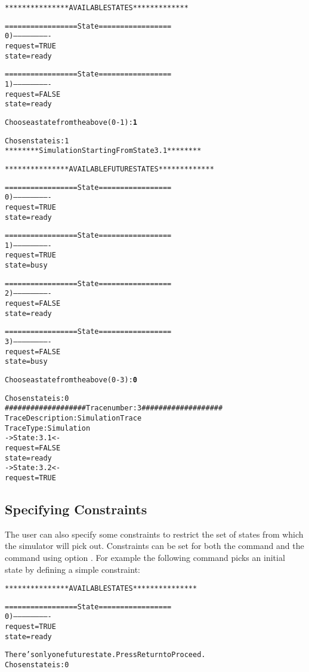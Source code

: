 \begin{alltt}
\nusmvprompt {}

***************  AVAILABLE STATES  *************

================= State =================
0) -------------------------
    request = TRUE
    state = ready

================= State =================
1) -------------------------
    request = FALSE
    state = ready


Choose a state from the above (0-1): {\bf 1} \ret

Chosen state is: 1
\nusmvprompt {}
********  Simulation Starting From State  3.1  ********

***************  AVAILABLE FUTURE STATES  *************

================= State =================
0) -------------------------
    request = TRUE
    state = ready

================= State =================
1) -------------------------
    request = TRUE
    state = busy

================= State =================
2) -------------------------
    request = FALSE
    state = ready

================= State =================
3) -------------------------
    request = FALSE
    state = busy


Choose a state from the above (0-3): {\bf 0} \ret

Chosen state is: 0
\nusmvprompt {}
################### Trace number: 3 ###################
Trace Description: Simulation Trace
Trace Type: Simulation
-> State: 3.1 <-
    request = FALSE
    state = ready
-> State: 3.2 <-
    request = TRUE
\end{alltt}

\subsection{Specifying Constraints}
\label{Specifying Constraints}
The user can also specify some constraints to restrict the
set of states from which the simulator will pick out. Constraints can
be set for both the  command and the 
command using option .  
For example the following command picks an initial state by defining
a simple constraint:
\begin{alltt}
\nusmvprompt {}

***************  AVAILABLE STATES  ***************

================= State =================
0) -------------------------
    request = TRUE
    state = ready


There's only one future state. Press Return to Proceed. \ret
Chosen state is: 0
\nusmvprompt {}
\shellprompt 
\end{alltt}

